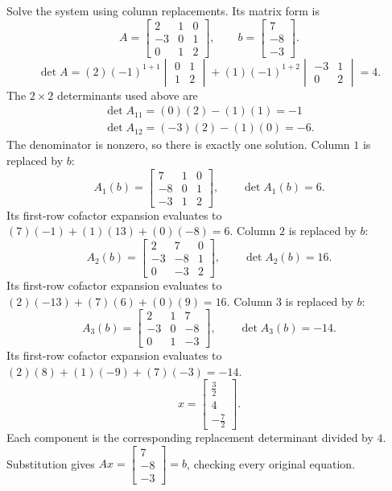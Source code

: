 \goal Solve the system using column replacements. Its matrix form is
\[A=\begin{bmatrix}2&1&0\\-3&0&1\\0&1&2\end{bmatrix},\qquad b=\begin{bmatrix}7\\-8\\-3\end{bmatrix}.\]
\[
\det A=(2)(-1)^{1+1}\begin{vmatrix}0&1\\1&2\end{vmatrix} + (1)(-1)^{1+2}\begin{vmatrix}-3&1\\0&2\end{vmatrix}=4.
\]
The $2\times2$ determinants used above are
\[
\begin{gathered}\det A_{11}=(0)(2)-(1)(1)=-1\\\det A_{12}=(-3)(2)-(1)(0)=-6.\end{gathered}
\]
The denominator is nonzero, so there is exactly one solution.
Column $1$ is replaced by $b$:
\[A_1(b)=\begin{bmatrix}7&1&0\\-8&0&1\\-3&1&2\end{bmatrix},\qquad\det A_1(b)=6.\]
Its first-row cofactor expansion evaluates to $(7)(-1) + (1)(13) + (0)(-8)=6$.
Column $2$ is replaced by $b$:
\[A_2(b)=\begin{bmatrix}2&7&0\\-3&-8&1\\0&-3&2\end{bmatrix},\qquad\det A_2(b)=16.\]
Its first-row cofactor expansion evaluates to $(2)(-13) + (7)(6) + (0)(9)=16$.
Column $3$ is replaced by $b$:
\[A_3(b)=\begin{bmatrix}2&1&7\\-3&0&-8\\0&1&-3\end{bmatrix},\qquad\det A_3(b)=-14.\]
Its first-row cofactor expansion evaluates to $(2)(8) + (1)(-9) + (7)(-3)=-14$.
\[x=\begin{bmatrix}\frac{3}{2}\\4\\- \frac{7}{2}\end{bmatrix}.\]
Each component is the corresponding replacement determinant divided by $4$. Substitution gives $Ax=\begin{bmatrix}7\\-8\\-3\end{bmatrix}=b$, checking every original equation.


